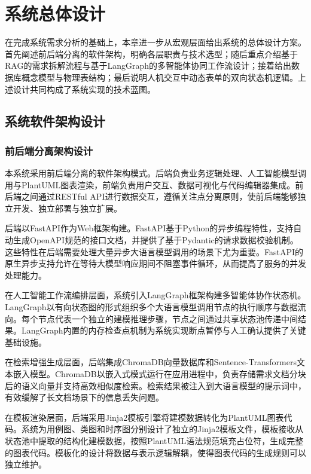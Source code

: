 \chapter{系统总体设计}
\vspace{7pt}

在完成系统需求分析的基础上，本章进一步从宏观层面给出系统的总体设计方案。首先阐述前后端分离的软件架构，明确各层职责与技术选型；随后重点介绍基于RAG的需求拆解流程与基于LangGraph的多智能体协同工作流设计；接着给出数据库概念模型与物理表结构；最后说明人机交互中动态表单的双向状态机逻辑。上述设计共同构成了系统实现的技术蓝图。

\section{系统软件架构设计}

\subsection{前后端分离架构设计}

本系统采用前后端分离的软件架构模式。后端负责业务逻辑处理、人工智能模型调用与PlantUML图表渲染，前端负责用户交互、数据可视化与代码编辑器集成。前后端之间通过RESTful API进行数据交互，遵循关注点分离原则，使前后端能够独立开发、独立部署与独立扩展。

后端以FastAPI作为Web框架构建。FastAPI基于Python的异步编程特性，支持自动生成OpenAPI规范的接口文档，并提供了基于Pydantic的请求数据校验机制。这些特性在后端需要处理大量异步大语言模型调用的场景下尤为重要。FastAPI的原生异步支持允许在等待大模型响应期间不阻塞事件循环，从而提高了服务的并发处理能力。

在人工智能工作流编排层面，系统引入LangGraph框架构建多智能体协作状态机。LangGraph以有向状态图的形式组织多个大语言模型调用节点的执行顺序与数据流向。每个节点代表一个独立的建模推理步骤，节点之间通过共享状态池传递中间结果。LangGraph内置的内存检查点机制为系统实现断点暂停与人工确认提供了关键基础设施。

在检索增强生成层面，后端集成ChromaDB向量数据库和Sentence-Transformers文本嵌入模型。ChromaDB以嵌入式模式运行在应用进程中，负责存储需求文档分块后的语义向量并支持高效相似度检索。检索结果被注入到大语言模型的提示词中，有效缓解了长文档场景下的信息丢失问题。

在模板渲染层面，后端采用Jinja2模板引擎将建模数据转化为PlantUML图表代码。系统为用例图、类图和时序图分别设计了独立的Jinja2模板文件，模板接收从状态池中提取的结构化建模数据，按照PlantUML语法规范填充占位符，生成完整的图表代码。模板化的设计将数据与表示逻辑解耦，使得图表代码的生成规则可以独立维护。

